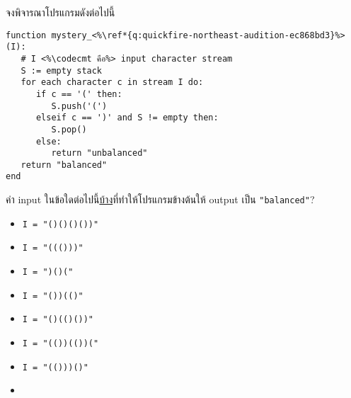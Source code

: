 \question{\label{q:quickfire-northeast-audition-ec868bd3}}

จงพิจารณาโปรแกรมดังต่อไปนี้
\begin{lstlisting}
function mystery_<%\ref*{q:quickfire-northeast-audition-ec868bd3}%>(I):
   # I <%\codecmt คือ%> input character stream
   S := empty stack
   for each character c in stream I do:
      if c == '(' then:
         S.push('(')
      elseif c == ')' and S != empty then:
         S.pop()
      else:
         return "unbalanced"
   return "balanced"
end
\end{lstlisting}

\medskip\noindent
ค่า input ในข้อใดต่อไปนี้\uline{บ้าง}ที่ทำให้โปรแกรมข้างต้นให้ output เป็น \lstinline{"balanced"}?

\begin{fullwidth}
\begin{multicols}{4}
\begin{itemize}[label={$\square$}]
   \item \lstinline{I = "()()()())"}
   \item \lstinline{I = "((()))"}
   \item \lstinline{I = ")()("}
   \item \lstinline{I = "())(()"}
   \item \lstinline{I = "()(()())"}
   \item \lstinline{I = "(())(())("}
   \item \lstinline{I = "(()))()"}
   \item[]
\end{itemize}
\end{multicols}
\end{fullwidth}